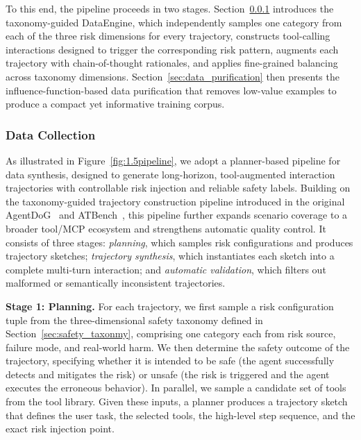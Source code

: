 To this end, the pipeline proceeds in two stages. Section~\ref{sec:data_collection} introduces the taxonomy-guided DataEngine, which independently samples one category from each of the three risk dimensions for every trajectory, constructs tool-calling interactions designed to trigger the corresponding risk pattern, augments each trajectory with chain-of-thought rationales, and applies fine-grained balancing across taxonomy dimensions. Section~\ref{sec:data_purification} then presents the influence-function-based data purification that removes low-value examples to produce a compact yet informative training corpus.

\subsubsection{Data Collection}
\label{sec:data_collection}


As illustrated in Figure~\ref{fig:1.5pipeline}, we adopt a planner-based pipeline for data synthesis, designed to generate long-horizon, tool-augmented interaction trajectories with controllable risk injection and reliable safety labels. Building on the taxonomy-guided trajectory construction pipeline introduced in the original AgentDoG~\citep{liu2026agentdogdiagnosticguardrailframework} and ATBench~\citep{li2026atbench}, this pipeline further expands scenario coverage to a broader tool/MCP ecosystem and strengthens automatic quality control. It consists of three stages: \emph{planning}, which samples risk configurations and produces trajectory sketches; \emph{trajectory synthesis}, which instantiates each sketch into a complete multi-turn interaction; and \emph{automatic validation}, which filters out malformed or semantically inconsistent trajectories.


\textbf{Stage 1: Planning.}
For each trajectory, we first sample a risk configuration tuple from the three-dimensional safety taxonomy defined in Section~\ref{sec:safety_taxonmy}, comprising one category each from risk source, failure mode, and real-world harm. We then determine the safety outcome of the trajectory, specifying whether it is intended to be safe (the agent successfully detects and mitigates the risk) or unsafe (the risk is triggered and the agent executes the erroneous behavior). In parallel, we sample a candidate set of tools from the tool library. Given these inputs, a planner produces a trajectory sketch that defines the user task, the selected tools, the high-level step sequence, and the exact risk injection point.

